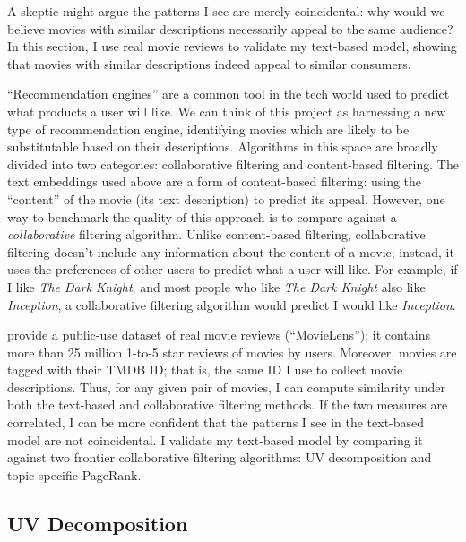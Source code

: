 \documentclass{article}
\begin{document}
A skeptic might argue the patterns I see are merely coincidental: why would we believe movies with similar descriptions necessarily appeal to the same audience? In this section, I use real movie reviews to validate my text-based model, showing that movies with similar descriptions indeed appeal to similar consumers.

``Recommendation engines'' are a common tool in the tech world used to predict what products a user will like. We can think of this project as harnessing a new type of recommendation engine, identifying movies which are likely to be substitutable based on their descriptions. Algorithms in this space are broadly divided into two categories: collaborative filtering and content-based filtering. The text embeddings used above are a form of content-based filtering: using the ``content'' of the movie (its text description) to predict its appeal. However, one way to benchmark the quality of this approach is to compare against a \emph{collaborative} filtering algorithm. Unlike content-based filtering, collaborative filtering doesn't include any information about the content of a movie; instead, it uses the preferences of other users to predict what a user will like. For example, if I like \emph{The Dark Knight}, and most people who like \emph{The Dark Knight} also like \emph{Inception}, a collaborative filtering algorithm would predict I would like \emph{Inception}. 

\textcite{harper2016ATIIS} provide a public-use dataset of real movie reviews (``MovieLens''); it contains more than 25 million 1-to-5 star reviews of movies by users. Moreover, movies are tagged with their TMDB ID; that is, the same ID I use to collect movie descriptions. Thus, for any given pair of movies, I can compute similarity under both the text-based and collaborative filtering methods. If the two measures are correlated, I can be more confident that the patterns I see in the text-based model are not coincidental. I validate my text-based model by comparing it against two frontier collaborative filtering algorithms: UV decomposition and topic-specific PageRank.

\pagebreak

\subsection{UV Decomposition}
\end{document}
